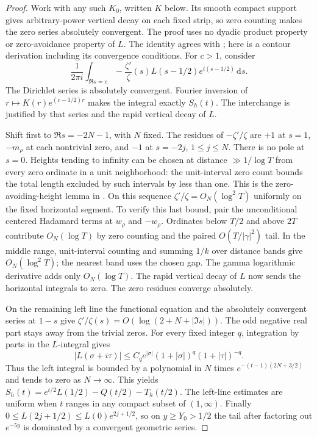 \documentclass[11pt]{article}
\theoremstyle{remark}\newtheorem{remark}[theorem]{Remark}
\newcommand{\dd}{\,\mathrm d}
\begin{document}
\begin{proof}
Work with any such $K_0$, written $K$ below. Its smooth
compact support gives arbitrary-power vertical decay on
each fixed strip, so zero counting makes the zero series
absolutely convergent. The proof uses no dyadic product
property or zero-avoidance property of $L$.
The identity agrees with \cite[\texttt{04\_explicit\_formula.tex},
equation \texttt{J-explicit}, after reflection]{PacketSource};
here is a contour derivation including its convergence conditions.
For $c>1$, consider
\[
 \frac1{2\pi i}\int_{\Re s=c}
 -\frac{\zeta'}{\zeta}(s)L(s-1/2)e^{t(s-1/2)}\dd s.
\]
The Dirichlet series is absolutely convergent. Fourier inversion of
$r\mapsto K(r)e^{(c-1/2)r}$ makes the integral exactly $S_h(t)$.
The interchange is justified by that series and the rapid vertical
decay of $L$.

Shift first to $\Re s=-2N-1$, with $N$ fixed. The residues of
$-\zeta'/\zeta$ are $+1$ at $s=1$, $-m_\rho$ at each nontrivial
zero, and $-1$ at $s=-2j$, $1\le j\le N$.
There is no pole at $s=0$. Heights tending to infinity can be
chosen at distance $\gg1/\log T$ from every zero ordinate in a
unit neighborhood: the unit-interval zero count bounds the total
length excluded by such intervals by less than one.
This is the zero-avoiding-height lemma in
\cite[\texttt{04\_explicit\_formula.tex},
Lemma \texttt{zero-avoiding-heights}]{PacketSource}.
On this sequence $\zeta'/\zeta=O_N(\log^2 T)$ uniformly on
the fixed horizontal segment. To verify this last bound,
pair the unconditional centered Hadamard terms at
$w_\rho$ and $-w_\rho$. Ordinates below $T/2$ and above $2T$
contribute $O_N(\log T)$ by zero counting and the paired
$O(T/|\gamma|^2)$ tail. In the middle range, unit-interval
counting and summing $1/k$ over distance bands give
$O_N(\log^2 T)$; the nearest band uses the chosen gap.
The gamma logarithmic derivative adds only $O_N(\log T)$.
The rapid vertical decay of $L$ now sends the horizontal
integrals to zero. The zero residues converge absolutely.

On the remaining left line the functional equation and the
absolutely convergent series at $1-s$ give
$\zeta'/\zeta(s)=O(\log(2+N+|\Im s|))$.
The odd negative real part stays away from the trivial zeros.
For every fixed integer $q$, integration by parts in the $L$-integral
gives
\[
 |L(\sigma+i\tau)|\le C_q e^{|\sigma|}
 (1+|\sigma|)^q(1+|\tau|)^{-q}.
\]
Thus the left integral is bounded by a polynomial in $N$
times $e^{-(t-1)(2N+3/2)}$ and tends to zero as $N\to\infty$.
This yields
$S_h(t)=e^{t/2}L(1/2)-Q(t/2)-T_h(t/2)$.
The left-line estimates are uniform when $t$ ranges in any
compact subset of $(1,\infty)$.
Finally $0\le L(2j+1/2)\le L(0)e^{2j+1/2}$, so on
$y\ge Y_0>1/2$ the tail after factoring out $e^{-5y}$
is dominated by a convergent geometric series.
\end{proof}
\end{document}
